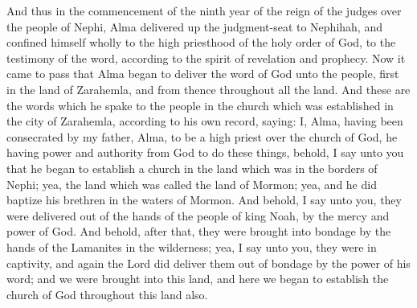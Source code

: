 And thus in the commencement of the ninth year of the reign of the judges over the people of Nephi, Alma delivered up the judgment-seat to Nephihah, and confined himself wholly to the high priesthood of the holy order of God, to the testimony of the word, according to the spirit of revelation and prophecy.
\bchapter
\bverse \iffalse Now it came to pass that Alma began to deliver the word of God unto the people, first in the land of Zarahemla, and from thence throughout all the land. \fi
Now it came to pass that Alma began to deliver the word of God unto the people, first in the land of Zarahemla, and from thence throughout all the land.
\bverse \iffalse And these are the words which he spake to the people in the church which was established in the city of Zarahemla, according to his own record, saying: \fi
And these are the words which he spake to the people in the church which was established in the city of Zarahemla, according to his own record, saying:
\bverse \iffalse I, Alma, having been consecrated by my father, Alma, to be a high priest over the church of God, he having power and authority from God to do these things, behold, I say unto you that he began to establish a church in the land which was in the borders of Nephi; yea, the land which was called the land of Mormon; yea, and he did baptize his brethren in the waters of Mormon. \fi
I, Alma, having been consecrated by my father, Alma, to be a high priest over the church of God, he having power and authority from God to do these things, behold, I say unto you that he began to establish a church in the land which was in the borders of Nephi; yea, the land which was called the land of Mormon; yea, and he did baptize his brethren in the waters of Mormon.
\bverse \iffalse And behold, I say unto you, they were delivered out of the hands of the people of king Noah, by the mercy and power of God. \fi
And behold, I say unto you, they were delivered out of the hands of the people of king Noah, by the mercy and power of God.
\bverse \iffalse And behold, after that, they were brought into bondage by the hands of the Lamanites in the wilderness; yea, I say unto you, they were in captivity, and again the Lord did deliver them out of bondage by the power of his word; and we were brought into this land, and here we began to establish the church of God throughout this land also. \fi
And behold, after that, they were brought into bondage by the hands of the Lamanites in the wilderness; yea, I say unto you, they were in captivity, and again the Lord did deliver them out of bondage by the power of his word; and we were brought into this land, and here we began to establish the church of God throughout this land also.
